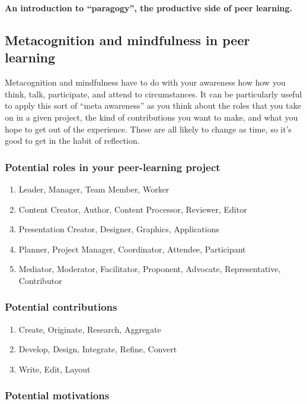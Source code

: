 \textbf{An introduction to ``paragogy'', the productive side of peer
learning.}

\subsection{Metacognition and mindfulness in peer learning}

Metacognition and mindfulness have to do with your awareness how how you
think, talk, participate, and attend to circumstances. It can be
particularly useful to apply this sort of ``meta awareness'' as you
think about the roles that you take on in a given project, the kind of
contributions you want to make, and what you hope to get out of the
experience. These are all likely to change as time, so it's good to get
in the habit of reflection.

\subsubsection{Potential roles in your peer-learning project}

\begin{enumerate}
\item
  Leader, Manager, Team Member, Worker
\item
  Content Creator, Author, Content Processor, Reviewer, Editor
\item
  Presentation Creator, Designer, Graphics, Applications
\item
  Planner, Project Manager, Coordinator, Attendee, Participant
\item
  Mediator, Moderator, Facilitator, Proponent, Advocate, Representative,
  Contributor
\end{enumerate}
\subsubsection{Potential contributions}

\begin{enumerate}
\item
  Create, Originate, Research, Aggregate
\item
  Develop, Design, Integrate, Refine, Convert
\item
  Write, Edit, Layout
\end{enumerate}
\subsubsection{Potential motivations}

